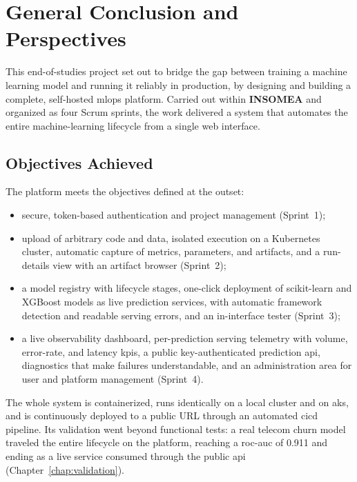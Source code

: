 \chapter*{General Conclusion and Perspectives}

This end-of-studies project set out to bridge the gap between training a machine
learning model and running it reliably in production, by designing and building a
complete, self-hosted \gls{mlops} platform. Carried out within \textbf{INSOMEA}
and organized as four Scrum sprints, the work delivered a system that automates the
entire machine-learning lifecycle from a single web interface.

\section*{Objectives Achieved}
The platform meets the objectives defined at the outset:
\begin{itemize}[leftmargin=1.4em]
  \item secure, token-based authentication and project management
        (Sprint~1);
  \item upload of arbitrary code and data, isolated execution on a Kubernetes
        cluster, automatic capture of metrics, parameters, and artifacts, and a
        run-details view with an artifact browser (Sprint~2);
  \item a model registry with lifecycle stages, one-click deployment of
        scikit-learn and XGBoost models as live prediction services, with
        automatic framework detection and readable serving errors, and an
        in-interface tester (Sprint~3);
  \item a live observability dashboard, per-prediction serving telemetry with
        volume, error-rate, and latency \glspl{kpi}, a public key-authenticated
        prediction \gls{api}, diagnostics that make failures understandable, and
        an administration area for user and platform management (Sprint~4).
\end{itemize}
The whole system is containerized, runs identically on a local cluster and on
\gls{aks}, and is continuously deployed to a public URL through an automated
\gls{cicd} pipeline. Its validation went beyond functional tests: a real
telecom churn model traveled the entire lifecycle on the platform, reaching a
\gls{roc}-\gls{auc} of 0.911 and ending as a live service consumed through the
public \gls{api} (Chapter~\ref{chap:validation}).

